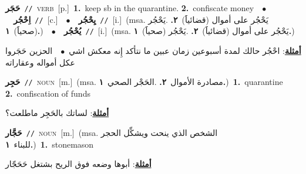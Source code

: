 \documentclass[10pt,a4paper,twoside]{article} %
\begin{document}
\begin{multicols}{2}
{\setlength\topsep{0pt}\textbf{\foreignlanguage{arabic}{حَجَر}}\ {\color{gray}\texttt{//}\color{black}}\ \textsc{verb}\ [p.]\ \textbf{1.}~keep sb in the quarantine.  \textbf{2.}~confiscate money\ \ $\bullet$\ \ \setlength\topsep{0pt}\textbf{\foreignlanguage{arabic}{اِحْجُر}}\ {\color{gray}\texttt{//}\color{black}}\ [c.]\ \ $\bullet$\ \ \setlength\topsep{0pt}\textbf{\foreignlanguage{arabic}{يِحْجُر}}\ {\color{gray}\texttt{//}\color{black}}\ [i.]\ \color{gray}(msa. \foreignlanguage{arabic}{يَحْجُر على أموال (قضائياََ)}~\foreignlanguage{arabic}{\textbf{٢.}}  .\foreignlanguage{arabic}{يَحْجُر (صحياََ)}~\foreignlanguage{arabic}{\textbf{١.}})\color{black}\ \ $\bullet$\ \ \setlength\topsep{0pt}\textbf{\foreignlanguage{arabic}{يُحْجُر}}\ {\color{gray}\texttt{//}\color{black}}\ [i.]\ \color{gray}(msa. \foreignlanguage{arabic}{يَحْجُر على أموال (قضائياََ)}~\foreignlanguage{arabic}{\textbf{٢.}}  .\foreignlanguage{arabic}{يَحْجُر (صحياََ)}~\foreignlanguage{arabic}{\textbf{١.}})\color{black}\  \begin{flushright}\color{gray}\foreignlanguage{arabic}{\textbf{\underline{\foreignlanguage{arabic}{أمثلة}}}: احْجُر حالك لمدة أسبوعين زمان عبين ما نتأكد إِنه معكش اشي\ $\bullet$\ \  الحزين حَجَروا عكل أمواله وعقاراته}\end{flushright}\color{black}} \vspace{2mm}

{\setlength\topsep{0pt}\textbf{\foreignlanguage{arabic}{حَجِر}}\ {\color{gray}\texttt{//}\color{black}}\ \textsc{noun}\ [m.]\ \color{gray}(msa. \foreignlanguage{arabic}{مصادرة الأموال}~\foreignlanguage{arabic}{\textbf{٢.}}  .\foreignlanguage{arabic}{الحَجْر الصحي}~\foreignlanguage{arabic}{\textbf{١.}})\color{black}\ \textbf{1.}~quarantine  \textbf{2.}~confiscation of funds\  \begin{flushright}\color{gray}\foreignlanguage{arabic}{\textbf{\underline{\foreignlanguage{arabic}{أمثلة}}}: لساتك بالحَجِر ماطلعت؟}\end{flushright}\color{black}} \vspace{2mm}

{\setlength\topsep{0pt}\textbf{\foreignlanguage{arabic}{حَجَّار}}\ {\color{gray}\texttt{//}\color{black}}\ \textsc{noun}\ [m.]\ \color{gray}(msa. \foreignlanguage{arabic}{الشخص الذي ينحت ويشكِّل الحجر للبناء}~\foreignlanguage{arabic}{\textbf{١.}})\color{black}\ \textbf{1.}~stonemason\  \begin{flushright}\color{gray}\foreignlanguage{arabic}{\textbf{\underline{\foreignlanguage{arabic}{أمثلة}}}: أبوها وضعه فوق الريح بشتغل حَحَجّار}\end{flushright}\color{black}} \vspace{2mm}


\end{multicols}
\end{document}
